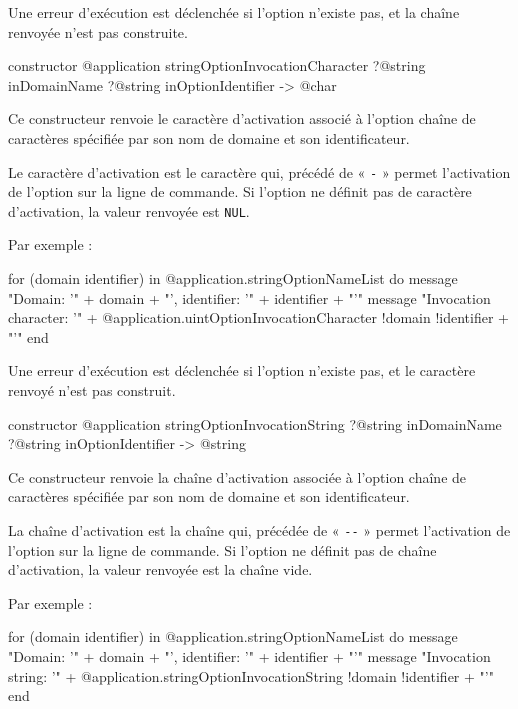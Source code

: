 Une erreur d'exécution est déclenchée si l'option n'existe pas, et la chaîne renvoyée n'est pas construite.



\begin{galgas3box}
constructor @application stringOptionInvocationCharacter
    ?@string inDomainName
    ?@string inOptionIdentifier -> @char
\end{galgas3box}

Ce constructeur renvoie le caractère d'activation associé à l'option chaîne de caractères spécifiée par son nom de domaine et son identificateur.

Le caractère d'activation est le caractère qui, précédé de « \texttt{-} » permet l'activation de l'option sur la ligne de commande. Si l'option ne définit pas de caractère d'activation, la valeur renvoyée est \texttt{NUL}.

 Par exemple :
\begin{galgas3}
for (domain identifier) in @application.stringOptionNameList do
  message "Domain: '" + domain + "', identifier: '" + identifier + "'\n"
  message "Invocation character: '"
    + @application.uintOptionInvocationCharacter {!domain !identifier} + "'\n"
end
\end{galgas3}

Une erreur d'exécution est déclenchée si l'option n'existe pas, et le caractère renvoyé n'est pas construit.



\begin{galgas3box}
constructor @application stringOptionInvocationString
    ?@string inDomainName
    ?@string inOptionIdentifier -> @string
\end{galgas3box}

Ce constructeur renvoie la chaîne d'activation associée à l'option chaîne de caractères spécifiée par son nom de domaine et son identificateur.

La chaîne d'activation est la chaîne qui, précédée de « \texttt{-{}-} » permet l'activation de l'option sur la ligne de commande. Si l'option ne définit pas de chaîne d'activation, la valeur renvoyée est la chaîne vide.

 Par exemple :
\begin{galgas3}
for (domain identifier) in @application.stringOptionNameList do
  message "Domain: '" + domain + "', identifier: '" + identifier + "'\n"
  message "Invocation string: '"
    + @application.stringOptionInvocationString {!domain !identifier} + "'\n"
end
\end{galgas3}

